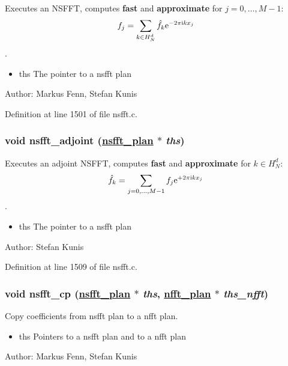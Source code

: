 Executes an NSFFT, computes {\bf fast} and {\bf approximate} for $j=0,\hdots,M-1$: \[ f_j = \sum_{k\in H_N^d}\hat f_k {\rm e}^{-2\pi{\rm\scriptsize i}k x_j} \]. 

\begin{itemize}
\item ths The pointer to a nsfft plan\end{itemize}
\begin{Desc}
\item[Author:]Markus Fenn, Stefan Kunis \end{Desc}


Definition at line 1501 of file nsfft.c.\hypertarget{group__nsfft_ga3}{
\subsubsection[nsfft\_\-adjoint]{\setlength{\rightskip}{0pt plus 5cm}void nsfft\_\-adjoint (\hyperlink{structnsfft__plan}{nsfft\_\-plan} $\ast$ {\em ths})}}
\label{group__nsfft_ga3}


Executes an adjoint NSFFT, computes {\bf fast} and {\bf approximate} for $k\in H_N^d$: \[ \hat f_k = \sum_{j=0,\hdots,M-1} f_j {\rm e}^{+2\pi{\rm\scriptsize i}k x_j} \]. 

\begin{itemize}
\item ths The pointer to a nsfft plan\end{itemize}
\begin{Desc}
\item[Author:]Stefan Kunis \end{Desc}


Definition at line 1509 of file nsfft.c.\hypertarget{group__nsfft_ga4}{
\subsubsection[nsfft\_\-cp]{\setlength{\rightskip}{0pt plus 5cm}void nsfft\_\-cp (\hyperlink{structnsfft__plan}{nsfft\_\-plan} $\ast$ {\em ths}, \hyperlink{structnfft__plan}{nfft\_\-plan} $\ast$ {\em ths\_\-nfft})}}
\label{group__nsfft_ga4}


Copy coefficients from nsfft plan to a nfft plan. 

\begin{itemize}
\item ths Pointers to a nsfft plan and to a nfft plan\end{itemize}
\begin{Desc}
\item[Author:]Markus Fenn, Stefan Kunis \end{Desc}


